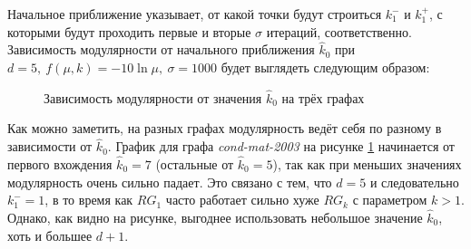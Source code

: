 Начальное приближение указывает, от какой точки будут строиться $k_1^{-}$ и $k_1^{+}$, с которыми будут проходить первые и вторые $\sigma$ итераций, соответственно. Зависимость модулярности от начального приближения $\hat{k}_0$ при $d = 5,\ f(\mu, k) = -10 \ln \mu,\ \sigma = 1000$ будет выглядеть следующим образом:

\begin{figure}[H]
	\columnwidth
	\columnwidth
	\caption{Зависимость модулярности от значения $\hat{k}_0$ на трёх графах}
	\label{fig:arg-k0}
\end{figure}

Как можно заметить, на разных графах модулярность ведёт себя по разному в зависимости от $\hat{k}_0$. График для графа \emph{cond-mat-2003} на рисунке \ref{fig:arg-k0} начинается от первого вхождения $\hat{k}_0 = 7$ (остальные от $\hat{k}_0 = 5$), так как при меньших значениях модулярность очень сильно падает. Это связано с тем, что $d = 5$ и следовательно $k_1^{-} = 1$, в то время как $RG_1$ часто работает сильно хуже $RG_k$ с параметром $k > 1$. Однако, как видно на рисунке, выгоднее использовать небольшое значение $\hat{k}_0$, хоть и большее $d + 1$.


